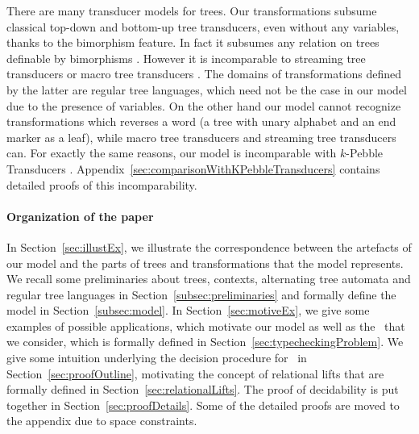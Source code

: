 There are many transducer models for trees. Our transformations subsume classical top-down and bottom-up tree transducers, even without any variables, thanks to the bimorphism feature. In fact it subsumes any relation on trees definable by bimorphisms \cite[Chapter 6]{tata}. However it is incomparable to streaming tree transducers \cite{StreamingTreeTransd} or macro tree transducers \cite{MacroTreeTransd}. The domains of transformations defined by the latter are regular tree languages, which need not be the case in our model due to the presence of variables. On the other hand our model cannot recognize transformations which reverses a word (a tree with unary alphabet and an end marker as a leaf), while macro tree transducers and streaming tree transducers can. For exactly the same reasons, our model is incomparable with \texorpdfstring{$k$}{k}-Pebble Transducers \cite{MSV2000}. Appendix~\ref{sec:comparisonWithKPebbleTransducers} contains detailed proofs of this incomparability.

\paragraph*{Organization of the paper}
In Section~\ref{sec:illustEx}, we illustrate the correspondence between the artefacts of our model and the parts of trees and transformations that the model represents. We recall some preliminaries about trees, contexts, alternating tree automata and regular tree languages in Section~\ref{subsec:preliminaries} and formally define the model in Section~\ref{subsec:model}. In Section~\ref{sec:motiveEx}, we give some examples of possible applications, which motivate our model as well as the \tcp\ that we consider, which is formally defined in Section~\ref{sec:typecheckingProblem}. We give some intuition underlying the decision procedure for \tcp\ in Section~\ref{sec:proofOutline}, motivating the concept of relational lifts that are formally defined in Section~\ref{sec:relationalLifts}. The proof of decidability is put together in Section~\ref{sec:proofDetails}. Some of the detailed proofs are moved to the appendix due to space constraints.